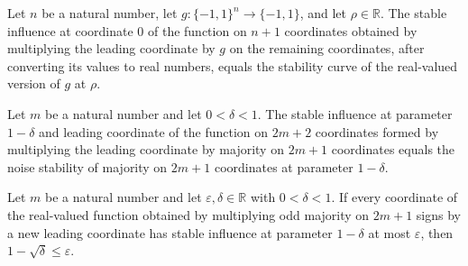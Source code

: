 \begin{theorem}
\label{FABL.stableInfluence_leadingCoordinateTimes_eq_stabilityCurve}
\leanok
{}
Let $n$ be a natural number, let $g:\{−1,1\}^n\to\{−1,1\}$, and let $\rho\in\mathbb R$.
The stable influence at coordinate $0$ of the function on $n+1$ coordinates obtained by
multiplying the leading coordinate by $g$ on the remaining coordinates, after converting
its values to real numbers, equals the stability curve of the real-valued version of $g$
at $\rho$.
\end{theorem}

\begin{theorem}
\label{FABL.stableInfluence_leadingCoordinateTimes_majority_odd_eq_noiseStability}
\leanok
{}
Let $m$ be a natural number and let $0<\delta<1$. The stable influence at parameter
$1-\delta$ and leading coordinate of the function on $2m+2$ coordinates formed by
multiplying the leading coordinate by majority on $2m+1$ coordinates equals the noise
stability of majority on $2m+1$ coordinates at parameter $1-\delta$.
\end{theorem}

\begin{theorem}
\label{FABL.one_sub_sqrt_le_of_hasSmallStableInfluences_leadingCoordinateTimes_majority_odd}
\leanok
{}
Let $m$ be a natural number and let $\varepsilon,\delta\in\mathbb R$ with $0<\delta<1$.
If every coordinate of the real-valued function obtained by multiplying odd majority on
$2m+1$ signs by a new leading coordinate has stable influence at parameter $1-\delta$ at
most $\varepsilon$, then $1-\sqrt{\delta}\leq\varepsilon$.
\end{theorem}

